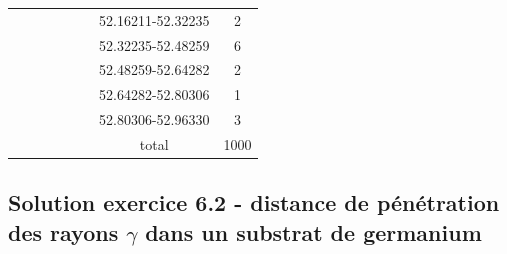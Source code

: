 \begin{table}[p]
\begin{center}
\begin{tabular}{cccccccc}
                                                              & & & & & & 52.16211-52.32235 &  2 \\
                                                              & & & & & & 52.32235-52.48259 &  6 \\
                                                              & & & & & & 52.48259-52.64282 &  2 \\
                                                              & & & & & & 52.64282-52.80306 &  1 \\
                                                              & & & & & & 52.80306-52.96330 &  3 \\
                                                              & & & & & & total & 1000 \\\hline
\end{tabular}
\end{center}
\label{tab:cl}
\normalsize
\end{table}


\newpage

\subsection*{Solution exercice 6.2 - distance de pénétration des rayons $\gamma$ dans un substrat de germanium}

